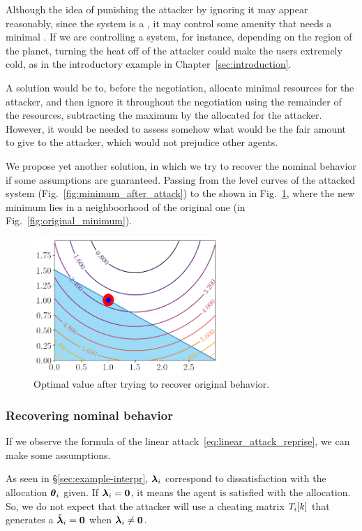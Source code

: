 \documentclass[../main.tex]{subfiles}
\begin{document}
Although the idea of punishing the attacker by ignoring it may appear reasonably, since the system is a \cps{}, it may control some amenity that needs a minimal \QoS{}.
If we are controlling a \HVAC{} system, for instance, depending on the region of the planet, turning the heat off of the attacker could make the users extremely cold, as in the introductory example in Chapter~\ref{sec:introduction}.

A solution would be to, before the negotiation, allocate minimal resources for the attacker, and then ignore it throughout the negotiation using the remainder of the resources, subtracting the maximum by the allocated for the attacker.
However, it would be needed to assess somehow what would be the fair amount to give to the attacker, which would not prejudice other agents.

We propose yet another solution, in which we try to recover the nominal behavior if some assumptions are guaranteed.
Passing from the level curves of the attacked system (Fig.~\ref{fig:minimum_after_attack}) to the shown in Fig.~\ref{fig:minimum_recovered}, where the new minimum lies in a neighboorhood of the original one (in Fig.~\ref{fig:original_minimum}).

\begin{figure}[h]
  \centering
  \includegraphics[width=7cm]{../img/resilient_eq/correctX.png}
  \caption{Optimal value after trying to recover original behavior.}\label{fig:minimum_recovered}
\end{figure}

\subsubsection{Recovering nominal behavior}\label{sec:recov-nomin-behav}
If we observe the formula of the linear attack~\eqref{eq:linear_attack_reprise}, we can make some assumptions.

As seen in \S\ref{sec:example-interpr}, $\boldsymbol{\lambda}_{i}$ correspond to dissatisfaction with the allocation $\boldsymbol{\theta}_{i}$ given.
If $\boldsymbol{\lambda}_{i}=\mathbf{0}$, it means the agent is satisfied with the allocation.
So, we do not expect that the attacker will use a cheating matrix $T_{i}[k]$ that generates a $\tilde{\boldsymbol{\lambda}}_{i}=\mathbf{0}$ when $\boldsymbol{\lambda}_{i}\neq\mathbf{0}$.
\end{document}
